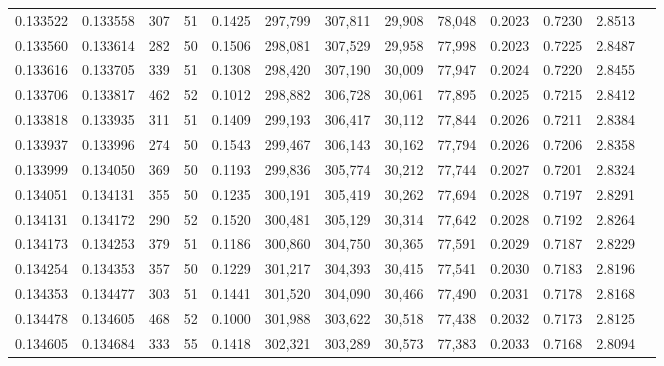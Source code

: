 \begin{tabular}{rrrrrrrrrrrrr}
0.133522 & 0.133558 &   307 &  51 &                                     0.1425 & 297,799 & 307,811 &  29,908 &  78,048 & 0.2023 & 0.7230 & 2.8513 \\
0.133560 & 0.133614 &   282 &  50 &                                     0.1506 & 298,081 & 307,529 &  29,958 &  77,998 & 0.2023 & 0.7225 & 2.8487 \\
0.133616 & 0.133705 &   339 &  51 &                                     0.1308 & 298,420 & 307,190 &  30,009 &  77,947 & 0.2024 & 0.7220 & 2.8455 \\
0.133706 & 0.133817 &   462 &  52 &                                     0.1012 & 298,882 & 306,728 &  30,061 &  77,895 & 0.2025 & 0.7215 & 2.8412 \\
0.133818 & 0.133935 &   311 &  51 &                                     0.1409 & 299,193 & 306,417 &  30,112 &  77,844 & 0.2026 & 0.7211 & 2.8384 \\
0.133937 & 0.133996 &   274 &  50 &                                     0.1543 & 299,467 & 306,143 &  30,162 &  77,794 & 0.2026 & 0.7206 & 2.8358 \\
0.133999 & 0.134050 &   369 &  50 &                                     0.1193 & 299,836 & 305,774 &  30,212 &  77,744 & 0.2027 & 0.7201 & 2.8324 \\
0.134051 & 0.134131 &   355 &  50 &                                     0.1235 & 300,191 & 305,419 &  30,262 &  77,694 & 0.2028 & 0.7197 & 2.8291 \\
0.134131 & 0.134172 &   290 &  52 &                                     0.1520 & 300,481 & 305,129 &  30,314 &  77,642 & 0.2028 & 0.7192 & 2.8264 \\
0.134173 & 0.134253 &   379 &  51 &                                     0.1186 & 300,860 & 304,750 &  30,365 &  77,591 & 0.2029 & 0.7187 & 2.8229 \\
0.134254 & 0.134353 &   357 &  50 &                                     0.1229 & 301,217 & 304,393 &  30,415 &  77,541 & 0.2030 & 0.7183 & 2.8196 \\
0.134353 & 0.134477 &   303 &  51 &                                     0.1441 & 301,520 & 304,090 &  30,466 &  77,490 & 0.2031 & 0.7178 & 2.8168 \\
0.134478 & 0.134605 &   468 &  52 &                                     0.1000 & 301,988 & 303,622 &  30,518 &  77,438 & 0.2032 & 0.7173 & 2.8125 \\
0.134605 & 0.134684 &   333 &  55 &                                     0.1418 & 302,321 & 303,289 &  30,573 &  77,383 & 0.2033 & 0.7168 & 2.8094 \\

\end{tabular}
